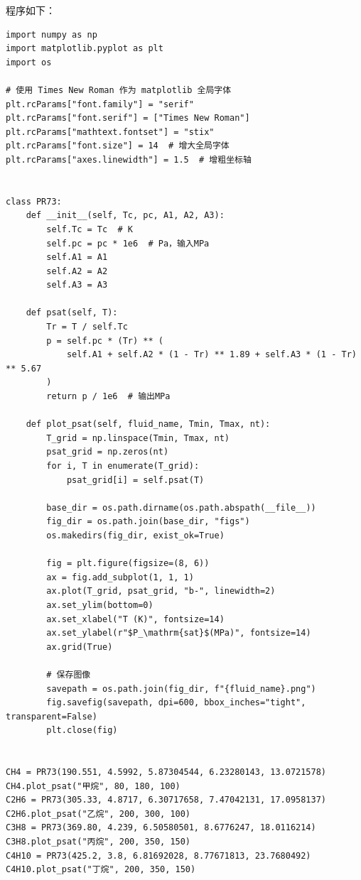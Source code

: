 \documentclass[12pt,a4paper]{article}
\begin{document}
程序如下：
\begin{lstlisting}
import numpy as np
import matplotlib.pyplot as plt
import os

# 使用 Times New Roman 作为 matplotlib 全局字体
plt.rcParams["font.family"] = "serif"
plt.rcParams["font.serif"] = ["Times New Roman"]
plt.rcParams["mathtext.fontset"] = "stix"
plt.rcParams["font.size"] = 14  # 增大全局字体
plt.rcParams["axes.linewidth"] = 1.5  # 增粗坐标轴


class PR73:
    def __init__(self, Tc, pc, A1, A2, A3):
        self.Tc = Tc  # K
        self.pc = pc * 1e6  # Pa，输入MPa
        self.A1 = A1
        self.A2 = A2
        self.A3 = A3

    def psat(self, T):
        Tr = T / self.Tc
        p = self.pc * (Tr) ** (
            self.A1 + self.A2 * (1 - Tr) ** 1.89 + self.A3 * (1 - Tr) ** 5.67
        )
        return p / 1e6  # 输出MPa

    def plot_psat(self, fluid_name, Tmin, Tmax, nt):
        T_grid = np.linspace(Tmin, Tmax, nt)
        psat_grid = np.zeros(nt)
        for i, T in enumerate(T_grid):
            psat_grid[i] = self.psat(T)

        base_dir = os.path.dirname(os.path.abspath(__file__))
        fig_dir = os.path.join(base_dir, "figs")
        os.makedirs(fig_dir, exist_ok=True)

        fig = plt.figure(figsize=(8, 6))
        ax = fig.add_subplot(1, 1, 1)
        ax.plot(T_grid, psat_grid, "b-", linewidth=2)
        ax.set_ylim(bottom=0)
        ax.set_xlabel("T (K)", fontsize=14)
        ax.set_ylabel(r"$P_\mathrm{sat}$(MPa)", fontsize=14)
        ax.grid(True)

        # 保存图像
        savepath = os.path.join(fig_dir, f"{fluid_name}.png")
        fig.savefig(savepath, dpi=600, bbox_inches="tight", transparent=False)
        plt.close(fig)


CH4 = PR73(190.551, 4.5992, 5.87304544, 6.23280143, 13.0721578)
CH4.plot_psat("甲烷", 80, 180, 100)
C2H6 = PR73(305.33, 4.8717, 6.30717658, 7.47042131, 17.0958137)
C2H6.plot_psat("乙烷", 200, 300, 100)
C3H8 = PR73(369.80, 4.239, 6.50580501, 8.6776247, 18.0116214)
C3H8.plot_psat("丙烷", 200, 350, 150)
C4H10 = PR73(425.2, 3.8, 6.81692028, 8.77671813, 23.7680492)
C4H10.plot_psat("丁烷", 200, 350, 150)
\end{lstlisting}
\end{document}

